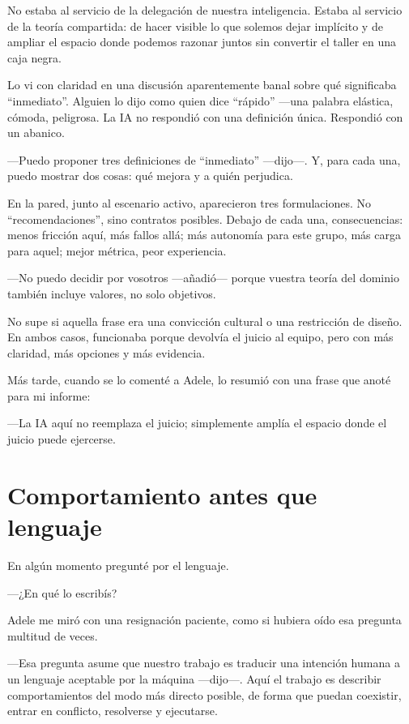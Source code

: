 \documentclass[11pt,a4paper]{article}
\begin{document}
No estaba al servicio de la delegación de nuestra inteligencia. Estaba al
servicio de la teoría compartida: de hacer visible lo que solemos dejar
implícito y de ampliar el espacio donde podemos razonar juntos sin convertir
el taller en una caja negra.

Lo vi con claridad en una discusión aparentemente banal sobre qué significaba
``inmediato''. Alguien lo dijo como quien dice ``rápido'' ---una palabra
elástica, cómoda, peligrosa. La IA no respondió con una definición única.
Respondió con un abanico.

---Puedo proponer tres definiciones de ``inmediato'' ---dijo---. Y, para cada
una, puedo mostrar dos cosas: qué mejora y a quién perjudica.

En la pared, junto al escenario activo, aparecieron tres formulaciones. No
``recomendaciones'', sino contratos posibles. Debajo de cada una,
consecuencias: menos fricción aquí, más fallos allá; más autonomía para este
grupo, más carga para aquel; mejor métrica, peor experiencia.

---No puedo decidir por vosotros ---añadió--- porque vuestra teoría del
dominio también incluye valores, no solo objetivos.

No supe si aquella frase era una convicción cultural o una restricción de
diseño. En ambos casos, funcionaba porque devolvía el juicio al equipo, pero
con más claridad, más opciones y más evidencia.

Más tarde, cuando se lo comenté a Adele, lo resumió con una frase que anoté
para mi informe:

---La IA aquí no reemplaza el juicio; simplemente amplía el espacio donde el
juicio puede ejercerse.

\section{Comportamiento antes que lenguaje}

En algún momento pregunté por el lenguaje.

---¿En qué lo escribís?

Adele me miró con una resignación paciente, como si hubiera oído esa pregunta
multitud de veces.

---Esa pregunta asume que nuestro trabajo es traducir una intención humana a
un lenguaje aceptable por la máquina ---dijo---. Aquí el trabajo es describir
comportamientos del modo más directo posible, de forma que puedan coexistir,
entrar en conflicto, resolverse y ejecutarse.
\end{document}
